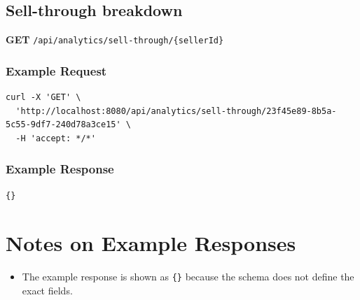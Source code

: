 \documentclass[a4paper,11pt]{article}
\begin{document}
\subsection{Sell-through breakdown}
\textbf{GET} \texttt{/api/analytics/sell-through/\{sellerId\}}
\subsubsection*{Example Request}
\begin{lstlisting}
curl -X 'GET' \
  'http://localhost:8080/api/analytics/sell-through/23f45e89-8b5a-5c55-9df7-240d78a3ce15' \
  -H 'accept: */*'
\end{lstlisting}

\subsubsection*{Example Response}
\begin{lstlisting}
{}
\end{lstlisting}

\section{Notes on Example Responses}
\begin{itemize}[leftmargin=1.2em]
  \item The example response is shown as \texttt{\{\}} because the schema does not define the exact fields.

\end{itemize}
\end{document}
